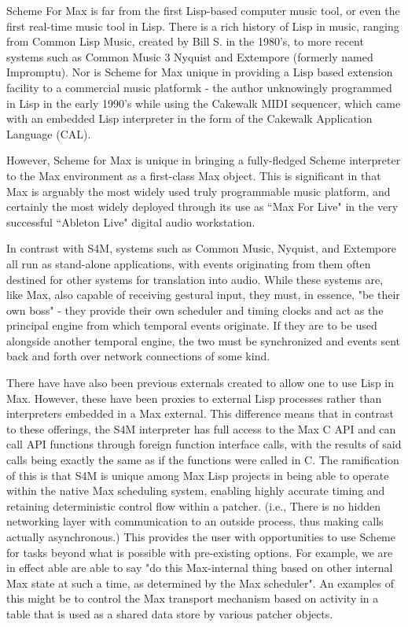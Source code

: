 \documentclass[acmsmall]{acmart}
\begin{document}
Scheme For Max is far from the first Lisp-based computer music tool, or even
the first real-time music tool in Lisp. There is a rich history of Lisp in music, 
ranging from Common Lisp Music, created by Bill S. in the 1980's, to more recent
systems such as Common Music 3 %
Nyquist %
and Extempore (formerly named Impromptu). %
Nor is Scheme for Max unique in providing a Lisp
based extension facility to a commercial music platformk - the author unknowingly
programmed in Lisp in the early 1990's while using the Cakewalk MIDI sequencer,
which came with an embedded Lisp interpreter in the form of the 
Cakewalk Application Language (CAL).

However, Scheme for Max is unique in bringing a fully-fledged Scheme interpreter
to the Max environment as a first-class Max object. This is significant in that Max
is arguably the most widely used truly programmable
music platform, and certainly the most widely deployed through its use as ``Max For Live" 
in the very successful ``Ableton Live" digital audio workstation. 

In contrast with S4M, systems such as Common Music, Nyquist, and Extempore
all run as stand-alone applications, with events originating from them often destined
for other systems for translation into audio. While these systems are, like Max, also capable
of receiving gestural input, they must, in essence, "be their own boss" - they provide
their own scheduler and timing clocks and act as the principal engine from which temporal
events originate. If they are to be used alongside another temporal engine, the two
must be synchronized and events sent back and forth over network connections of some kind.

There have have also been previous externals created to allow one to use Lisp in Max. 
However, these have been proxies to external Lisp processes rather than interpreters embedded
in a Max external.
This difference means that in contrast to these offerings, the S4M interpreter has full 
access to the Max C API and can call API functions through foreign function interface
calls, with the results of said calls being exactly the same as if the functions were called in C. 
The ramification of this is that S4M is unique among Max Lisp projects in being
able to operate within the native Max scheduling system, enabling highly accurate
timing and retaining deterministic control flow within a patcher. (i.e., There
is no hidden networking layer with communication to an outside process, thus making
calls actually asynchronous.)
This provides the user with opportunities to use Scheme for tasks beyond
what is possible with pre-existing options. For example, we are in effect able 
are able to say "do this Max-internal thing based on other internal Max state at such a time,
as determined by the Max scheduler". An examples of this might be to control
the Max transport mechanism based on activity in a table that is used as a 
shared data store by various patcher objects. 
\end{document}
